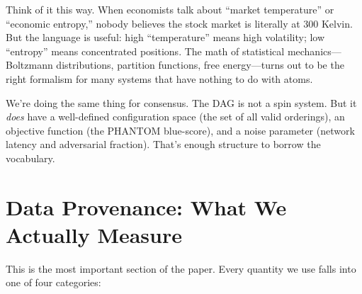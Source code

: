 \documentclass[11pt,a4paper]{article}
\begin{document}
Think of it this way. When economists talk about ``market temperature'' or ``economic entropy,'' nobody believes the stock market is literally at 300 Kelvin. But the language is useful: high ``temperature'' means high volatility; low ``entropy'' means concentrated positions. The math of statistical mechanics---Boltzmann distributions, partition functions, free energy---turns out to be the right formalism for many systems that have nothing to do with atoms.

We're doing the same thing for consensus. The DAG is not a spin system. But it \emph{does} have a well-defined configuration space (the set of all valid orderings), an objective function (the PHANTOM blue-score), and a noise parameter (network latency and adversarial fraction). That's enough structure to borrow the vocabulary.

\section{Data Provenance: What We Actually Measure}
\label{sec:provenance}

This is the most important section of the paper. Every quantity we use falls into one of four categories:
\end{document}

